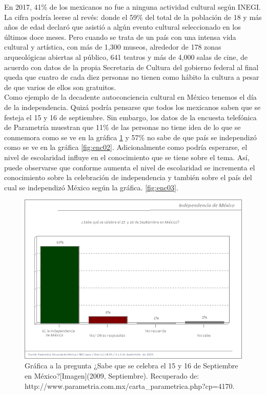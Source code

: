 En 2017, 41\% de los mexicanos no fue a ninguna actividad cultural según INEGI\cite{pp02}. La cifra podría leerse al revés: donde el 59\% del total de la población de 18 y más años de edad declaró que asistió a algún evento cultural seleccionado en los últimos doce meses. Pero cuando se trata de un país con una intensa vida cultural y artística, con más de 1,300 museos, alrededor de 178 zonas arqueológicas abiertas al público, 641 teatros y más de 4,000 salas de cine, de acuerdo con datos de la propia Secretaria de Cultura del gobierno federal\cite{pp01} al final queda que cuatro de cada diez personas no tienen como hábito la cultura a pesar de que varios de ellos son gratuitos.
\\[1pt]

Como ejemplo de la decadente autoconciencia cultural en México tenemos el día de la independencia. Quizá podría pensarse que todos los mexicanos saben que se festeja el 15 y 16 de septiembre. Sin embargo, los datos de la encuesta telefónica de Parametría\cite{pp03} muestran que 11\% de las personas no tiene idea de lo que se conmemora como se ve en la gráfica \ref{fig:enc01} y 57\% no sabe de que país se independizó como se ve en la gráfica \ref{fig:enc02}. Adicionalmente como podría esperarse, el nivel de escolaridad influye en el conocimiento que se tiene sobre el tema. Así, puede observarse que conforme aumenta el nivel de escolaridad se incrementa el conocimiento sobre la celebración de independencia y también sobre el país del cual se independizó México según la gráfica. \ref{fig:enc03}.
\\[1pt]

\begin{figure}
	\centering 
	\includegraphics[width=.50\textwidth]{03MarcoTeorico/imageR/enc01}
	\caption{Gráfica a la pregunta ¿Sabe que se celebra el 15 y 16 de Septiembre en México?[Imagen](2009, Septiembre). Recuperado de: http://www.parametria.com.mx/carta\_parametrica.php?cp=4170.}
	\label{fig:enc01}
\end{figure}

